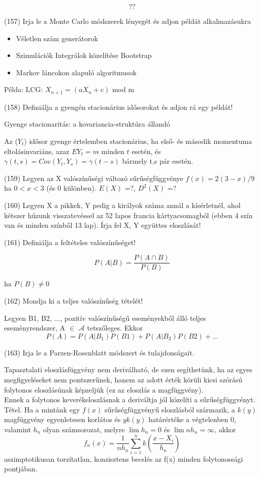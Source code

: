\documentclass[12p]{article}
\begin{document}
$$??$$

(157)  Irja le a Monte Carlo módszerek lényegét és adjon példát alkalmazásukra

\begin{itemize}
	\item Véletlen szám generátorok
	\item Szimulációk
	\subitem Integrálok közelítése
	\subitem Bootstrap
	\item Markov láncokon alapuló algoritmusok
\end{itemize}

Példa: LCG: $X_{n+1} = (aX_n + c)$ mod m

(158) Definiálja a gyengén stacionárius idősorokat és adjon rá egy példát!

Gyenge stacionaritás: a kovariancia-struktúra állandó

Az ($Y_t$) idősor gyenge értelemben stacionárius, ha első- és második momentuma eltolásinvariáns, azaz $EY_t = m$ minden $t$ esetén, és $\gamma(t,s) = Cov(Y_t, Y_s) = \gamma(t - s)$ bármely t,s pár esetén.

(159) Legyen az X valószínűségi változó sűrűségfüggvénye $f(x) = 2(3 - x)/9$ ha $0 < x < 3$ (és 0 különben). $E(X)$ =?, $D^2(X)$ =? 

(160) Legyen X a pikkek, Y pedig a királyok száma annál a kísérletnél, ahol kétszer húzunk
visszatevéssel az 52 lapos francia kártyacsomagból (ebben 4 szín van és minden színből 13
lap). Írja fel X, Y együttes eloszlását!

(161) Definiálja a feltételes valószínűséget!

$$P(A|B) = \frac{P(A \cap B)}{P(B)}$$

ha $P(B) \neq 0$

(162) Mondja ki a teljes valószínűség tételét!

Legyen B1, B2, ..., pozitív valószínűségű eseményekből álló teljes eseményrendszer, A $\in$ $\mathscr{A}$ tetszőleges. Ekkor
$$P(A) = P(A|B_1)P(B1)+P(A|B_2)P(B2)+ ...$$


(163) Irja le a Parzen-Rosenblatt módszert és tulajdonságait.

Tapasztalati eloszlásfüggvény nem deriválható, de ezen segíthetünk, ha az egyes megfigyeléseket nem pontszerűnek, hanem az adott érték körüli kicsi szórású folytonos eloszlásúnak képzeljük (ez az eloszlás a magfüggvény).\\
Ennek a folytonos keverékeloszlásnak a deriváltja jól közelíti a sűrűségfüggvényt.\\
Tétel. Ha a mintánk egy $f(x)$ sűrűségfüggvényű
eloszlásból származik, a $k(y)$ magfüggvény
egyenletesen korlátos és $yk(y)$ határértéke a
végtelenben 0, valamint $h_n$ olyan számsorozat,
melyre $\lim h_n = 0$ és $\lim nh_n = \infty$, akkor
$$f_n(x) = \frac{1}{nh_n} \sum^{n}_{i=1}k\left(\frac{x-X_i}{h_n}\right)$$ 
aszimptotikusan torzítatlan, konzisztens becslés az f(x) minden folytonossági pontjában.
\end{document}
